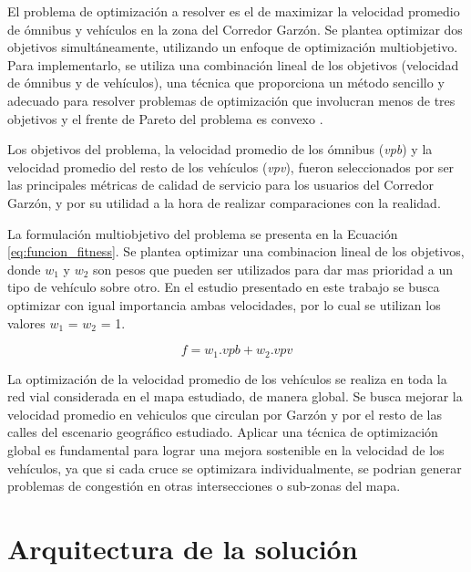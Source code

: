 El problema de optimización a resolver es el de maximizar la velocidad promedio de ómnibus y vehículos en la zona del Corredor Garzón. Se plantea optimizar dos objetivos simultáneamente, utilizando un enfoque de optimización multiobjetivo. Para implementarlo, se utiliza una combinación lineal de los objetivos (velocidad de ómnibus y de vehículos), una técnica que proporciona un método sencillo y adecuado para resolver problemas de optimización que involucran menos de tres objetivos y el frente de Pareto del problema es convexo \cite{coello2002evolutionary}.

Los objetivos del problema, la velocidad promedio de los ómnibus (\emph{vpb}) y la velocidad promedio del resto de los vehículos (\emph{vpv}), fueron seleccionados por ser las principales métricas de calidad de servicio para los usuarios del Corredor Garzón, y por su utilidad a la hora de realizar comparaciones con la realidad.

La formulación multiobjetivo del problema se presenta en la Ecuación \ref{eq:funcion_fitness}. Se plantea optimizar una combinacion lineal de los objetivos, donde \emph{$w_1$} y \emph{$w_2$} son pesos que pueden ser utilizados para dar mas prioridad a un tipo de vehículo sobre otro. En el estudio presentado en este trabajo se busca optimizar con igual importancia ambas velocidades, por lo cual se utilizan los valores $w_1$ = $w_2$ = 1.

\begin{equation}
\label{eq:funcion_fitness}
f = w_1.vpb + w_2.vpv
\end{equation}

La optimización de la velocidad promedio de los vehículos se realiza en toda la red vial considerada en el mapa estudiado, de manera global. Se busca mejorar la velocidad promedio en vehiculos que circulan por Garzón y por el resto de las calles del escenario geográfico estudiado. Aplicar una técnica de optimización global es fundamental para lograr una mejora sostenible en la velocidad de los vehículos, ya que si cada cruce se optimizara individualmente, se podrian generar problemas de congestión en otras intersecciones o sub-zonas del mapa.

\section{Arquitectura de la solución}


